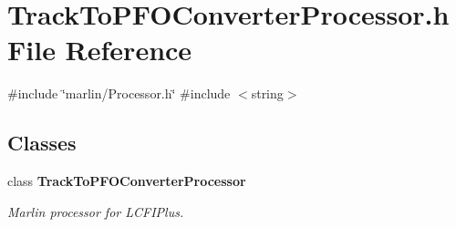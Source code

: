 \section{Track\+To\+P\+F\+O\+Converter\+Processor.\+h File Reference}
\label{TrackToPFOConverterProcessor_8h}
{\ttfamily \#include \char`\"{}marlin/\+Processor.\+h\char`\"{}}\newline
{\ttfamily \#include $<$string$>$}\newline
\subsection*{Classes}
\begin{DoxyCompactItemize}
\item 
class \textbf{ Track\+To\+P\+F\+O\+Converter\+Processor}
\begin{DoxyCompactList}\small\item\em Marlin processor for L\+C\+F\+I\+Plus. \end{DoxyCompactList}\end{DoxyCompactItemize}
